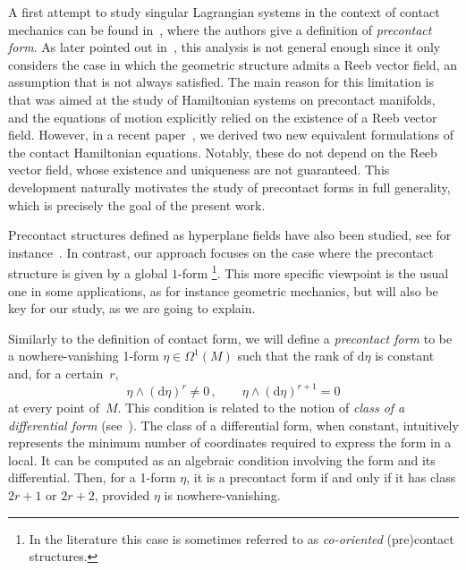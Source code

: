 \documentclass[11pt,twoside]{article}
\theoremstyle{plain}
\theoremstyle{definition}
\renewcommand{\d}{\mathrm{d}}
\def\d{\mathrm{d}}
\def\d{\mathrm{d}}
\begin{document}
A first attempt to study singular Lagrangian systems in the context of contact mechanics can be found in~\cite{LL_19a}, where the authors give a definition of \emph{precontact form}. 
As later pointed out in~\cite{LGGMR_23}, this analysis 
is not general enough
since it only considers the case in which the geometric structure admits a Reeb vector field, 
an assumption that is not always satisfied.
The main reason for this limitation is that \cite{LL_19a} was aimed at the study of Hamiltonian systems on precontact manifolds, and the equations of motion explicitly relied on the existence of a Reeb vector field. 
However, in a recent paper~\cite{GMRR_2025}, we derived two new equivalent formulations of the contact Hamiltonian equations. 
Notably, these do not depend on the Reeb vector field, whose existence and uniqueness are not guaranteed.
This development naturally motivates the study of precontact forms in full generality, which is precisely the goal of the present work.

Precontact structures defined as hyperplane fields have also been studied, see for instance~\cite{GG_23,Tor_2018,Vit_2018}.  
In contrast, our approach focuses on the case where the precontact structure is given by a global $1$-form%
\footnote{In the literature this case is sometimes referred to as \emph{co-oriented} (pre)contact structures.}. 
This more specific viewpoint is the usual one in some applications,
as for instance geometric mechanics,
but will also be key for our study,
as we are going to explain.

Similarly to the definition of contact form,
we will define a \emph{precontact form} to be a nowhere-vanishing 1-form 
$\eta\in \Omega^1(M)$ such that the rank of $\d\eta$ is constant and, for a certain~$r$,
$$    
\eta\wedge(\d\eta)^r \neq 0\,,
\qquad
\eta\wedge(\d\eta)^{r+1} = 0
$$
at every point of~$M$. 
This condition is related to the notion of \emph{class of a differential form} (see~\cite[Ch.\,VI]{god_1969}). 
The class of a differential form, when constant, intuitively represents the minimum number of coordinates required to express the form in a local.
It can be computed as an algebraic condition involving the form and its differential.
Then, for a 1-form $\eta$, it is a precontact form if and only if it has class $2r{+}1$ or $2r{+}2$, provided $\eta$ is nowhere-vanishing.
\end{document}

